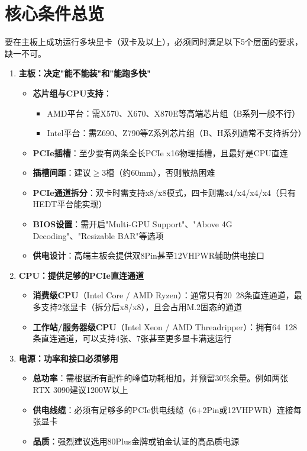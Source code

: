 \documentclass[12pt,UTF8]{ctexbook}
\begin{document}
\section{核心条件总览}

要在主板上成功运行多块显卡（双卡及以上），必须同时满足以下5个层面的要求，缺一不可。

\begin{enumerate}
    \item \textbf{主板：决定"能不能装"和"能跑多快"}
    \begin{itemize}[leftmargin=2em]
        \item \textbf{芯片组与CPU支持}：
        \begin{itemize}[leftmargin=2em]
            \item AMD平台：需X570、X670、X870E等高端芯片组（B系列一般不行）
            \item Intel平台：需Z690、Z790等Z系列芯片组（B、H系列通常不支持拆分）
        \end{itemize}
        \item \textbf{PCIe插槽}：至少要有两条全长PCIe x16物理插槽，且最好是CPU直连
        \item \textbf{插槽间距}：建议$\ge$3槽（约60mm），否则散热困难
        \item \textbf{PCIe通道拆分}：双卡时需支持x8/x8模式，四卡则需x4/x4/x4/x4（只有HEDT平台能实现）
        \item \textbf{BIOS设置}：需开启"Multi-GPU Support"、"Above 4G Decoding"、"Resizable BAR"等选项
        \item \textbf{供电设计}：高端主板会提供双8Pin甚至12VHPWR辅助供电接口
        \end{itemize}
    
    \item \textbf{CPU：提供足够的PCIe直连通道}
    \begin{itemize}[leftmargin=2em]
        \item \textbf{消费级CPU}（Intel Core / AMD Ryzen）：通常只有20~28条直连通道，最多支持2张显卡（拆分后x8/x8），且会占用M.2固态的通道
        \item \textbf{工作站/服务器级CPU}（Intel Xeon / AMD Threadripper）：拥有64~128条直连通道，可以支持4张、7张甚至更多显卡满速运行
    \end{itemize}
    
    \item \textbf{电源：功率和接口必须够用}
    \begin{itemize}[leftmargin=2em]
        \item \textbf{总功率}：需根据所有配件的峰值功耗相加，并预留30\%余量。例如两张RTX 3090建议1200W以上
        \item \textbf{供电线缆}：必须有足够多的PCIe供电线缆（6+2Pin或12VHPWR）连接每张显卡
        \item \textbf{品质}：强烈建议选用80Plus金牌或铂金认证的高品质电源
    \end{itemize}
    

\end{enumerate}
\end{document}
